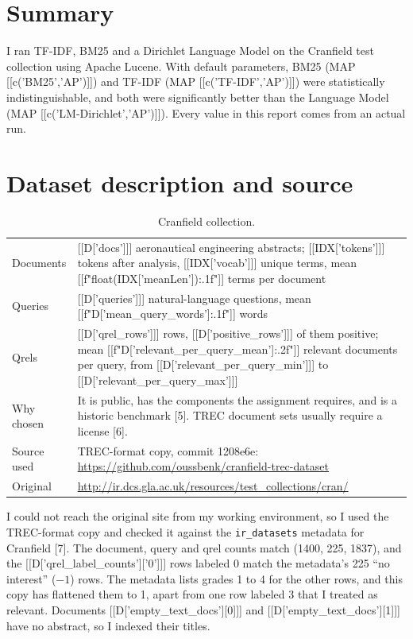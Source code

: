 
\section{Summary}
I ran TF-IDF, BM25 and a Dirichlet Language Model on the Cranfield test collection using Apache Lucene. With default parameters, BM25 (MAP [[c('BM25','AP')]]) and TF-IDF (MAP [[c('TF-IDF','AP')]]) were statistically indistinguishable, and both were significantly better than the Language Model (MAP [[c('LM-Dirichlet','AP')]]). Every value in this report comes from an actual run.

\section{Dataset description and source}
\begin{table}[H]\small\centering\caption{Cranfield collection.}
\begin{tabularx}{\linewidth}{@{}lY@{}}\toprule
Documents & [[D['docs']]] aeronautical engineering abstracts; [[IDX['tokens']]] tokens after analysis, [[IDX['vocab']]] unique terms, mean [[f"{float(IDX['meanLen']):.1f}"]] terms per document \\
Queries & [[D['queries']]] natural-language questions, mean [[f"{D['mean_query_words']:.1f}"]] words \\
Qrels & [[D['qrel_rows']]] rows, [[D['positive_rows']]] of them positive; mean [[f"{D['relevant_per_query_mean']:.2f}"]] relevant documents per query, from [[D['relevant_per_query_min']]] to [[D['relevant_per_query_max']]] \\
Why chosen & It is public, has the components the assignment requires, and is a historic benchmark [5]. TREC document sets usually require a license [6]. \\
Source used & TREC-format copy, commit 1208e6e: \url{https://github.com/oussbenk/cranfield-trec-dataset} \\
Original & \url{http://ir.dcs.gla.ac.uk/resources/test_collections/cran/} \\
\bottomrule\end{tabularx}\end{table}
I could not reach the original site from my working environment, so I used the TREC-format copy and checked it against the \texttt{ir\_datasets} metadata for Cranfield [7]. The document, query and qrel counts match (1400, 225, 1837), and the [[D['qrel_label_counts']['0']]] rows labeled 0 match the metadata's 225 ``no interest'' ($-1$) rows. The metadata lists grades 1 to 4 for the other rows, and this copy has flattened them to 1, apart from one row labeled 3 that I treated as relevant. Documents [[D['empty_text_docs'][0]]] and [[D['empty_text_docs'][1]]] have no abstract, so I indexed their titles.

